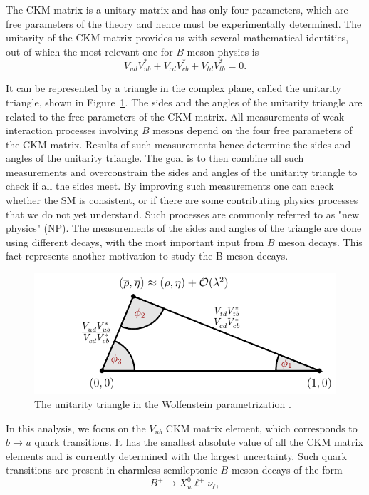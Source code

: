 The CKM matrix is a unitary matrix and has only four parameters, which are free parameters of the theory and hence must be experimentally determined. The unitarity of the CKM matrix provides us with several mathematical identities, out of which the most relevant one for $B$ meson physics is  
\begin{equation}
V_{ud}V_{ub}^* + V_{cd}V_{cb}^* + V_{td}V_{tb}^* = 0.
\end{equation}

It can be represented by a triangle in the complex plane, called the unitarity triangle, shown in Figure~\ref{ut}. The sides and the angles of the unitarity triangle are related to the free parameters of the CKM matrix. All measurements of weak interaction processes involving $B$ mesons depend on the four free parameters of the CKM matrix. Results of such measurements hence determine the sides and angles of the unitarity triangle. The goal is to then combine all such measurements and overconstrain the sides and angles of the unitarity triangle to check if all the sides meet. By improving such measurements one can check whether the SM is consistent, or if there are some contributing physics processes that we do not yet understand. Such processes are commonly referred to as "new physics" (NP). The measurements of the sides and angles of the triangle are done using different decays, with the most important input from $B$ meson decays. This fact represents another motivation to study the B meson decays.

\begin{figure}[H]
	\centering
	\includegraphics[scale=1]{texfig/UT_Triangle}
	\captionsetup{width=.8\linewidth}
	\caption{The unitarity triangle in the Wolfenstein parametrization \cite{PhysRevLett.51.1945}.}
	\label{ut}
\end{figure}

In this analysis, we focus on the $V_{ub}$ CKM matrix element, which corresponds to $b \to u$ quark transitions. It has the smallest absolute value of all the CKM matrix elements and is currently determined with the largest uncertainty. Such quark transitions are present in charmless semileptonic $B$ meson decays of the form
\begin{equation}
B^+ \to X_u^0 \ell^+ \nu_\ell,
\end{equation}

